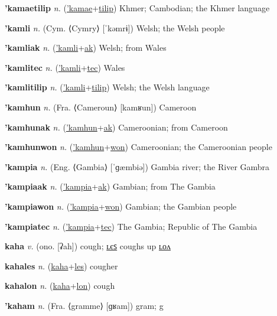 \textbf{\hypertarget{'kamaetilip}{'kamaetilip}} \textit{n.} (\hyperlink{'kamae}{'kamae}+\allowbreak \hyperlink{tilip}{tilip})
Khmer; Cambodian; the Khmer language

\textbf{\hypertarget{'kamli}{'kamli}} \textit{n.} (Cym. ⟨Cymry⟩ [ˈkəmrɨ])
Welsh; the Welsh people

\textbf{\hypertarget{'kamliak}{'kamliak}} \textit{n.} (\hyperlink{'kamli}{'kamli}+\allowbreak \hyperlink{ak}{ak})
Welsh; from Wales

\textbf{\hypertarget{'kamlitec}{'kamlitec}} \textit{n.} (\hyperlink{'kamli}{'kamli}+\allowbreak \hyperlink{tec}{tec})
Wales

\textbf{\hypertarget{'kamlitilip}{'kamlitilip}} \textit{n.} (\hyperlink{'kamli}{'kamli}+\allowbreak \hyperlink{tilip}{tilip})
Welsh; the Welsh language

\textbf{\hypertarget{'kamhun}{'kamhun}} \textit{n.} (Fra. ⟨Cameroun⟩ [kamʁun])
Cameroon

\textbf{\hypertarget{'kamhunak}{'kamhunak}} \textit{n.} (\hyperlink{'kamhun}{'kamhun}+\allowbreak \hyperlink{ak}{ak})
Cameroonian; from Cameroon

\textbf{\hypertarget{'kamhunwon}{'kamhunwon}} \textit{n.} (\hyperlink{'kamhun}{'kamhun}+\allowbreak \hyperlink{won}{won})
Cameroonian; the Cameroonian people

\textbf{\hypertarget{'kampia}{'kampia}} \textit{n.} (Eng. ⟨Gambia⟩ [ˈɡæmbiə])
Gambia river; the River Gambra

\textbf{\hypertarget{'kampiaak}{'kampiaak}} \textit{n.} (\hyperlink{'kampia}{'kampia}+\allowbreak \hyperlink{ak}{ak})
Gambian; from The Gambia

\textbf{\hypertarget{'kampiawon}{'kampiawon}} \textit{n.} (\hyperlink{'kampia}{'kampia}+\allowbreak \hyperlink{won}{won})
Gambian; the Gambian people

\textbf{\hypertarget{'kampiatec}{'kampiatec}} \textit{n.} (\hyperlink{'kampia}{'kampia}+\allowbreak \hyperlink{tec}{tec})
The Gambia; Republic of The Gambia

\textbf{\hypertarget{kaha}{kaha}} \textit{v.} (ono. [ʡah])
cough; \hyperlink{kahales}{ʟєꜱ} coughs up \hyperlink{kahalon}{ʟᴏᴧ}

\textbf{\hypertarget{kahales}{kahales}} \textit{n.} (\hyperlink{kaha}{kaha}+\allowbreak \hyperlink{les}{les})
cougher

\textbf{\hypertarget{kahalon}{kahalon}} \textit{n.} (\hyperlink{kaha}{kaha}+\allowbreak \hyperlink{lon}{lon})
cough

\textbf{\hypertarget{'kaham}{'kaham}} \textit{n.} (Fra. ⟨gramme⟩ [ɡʁam])
gram; g

